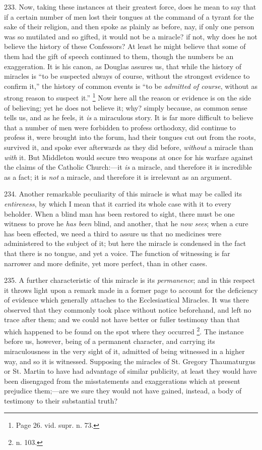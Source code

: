 233.
Now, taking these instances at their greatest force, does he mean to
say that if a certain number of men lost their tongues at the command
of a tyrant for the sake of their religion, and then spoke as plainly
as before, nay, if only one person was so mutilated and so gifted, it
would not be a miracle? if not, why does he not believe the history of
these Confessors? At least he might believe that some of them had the
gift of speech continued to them, though the numbers be an
exaggeration. It is his canon, as Douglas assures us, that while the
history of miracles is ``to be suspected always of course, without the
strongest evidence to confirm it,'' the history of common events is ``to
be \emph{admitted of course}, without as strong reason to suspect it.'' \footnote{Page 26. vid. supr. n. 73.} Now here all the reason or evidence is on the side of
believing; yet he does not believe it; why? simply because, as
common sense tells us, and as he feels, it \emph{is} a miraculous
story. It is far more difficult to believe that a number of men were
forbidden to profess orthodoxy, did continue to profess it, were
brought into the forum, had their tongues cut out from the roots,
survived it, and spoke ever afterwards as they did before, \emph{without}
a miracle than \emph{with} it. But Middleton would secure two weapons
at once for his warfare against the claims of the Catholic
Church:—it \emph{is} a miracle, and therefore it is incredible as a
fact; it is \emph{not} a miracle, and therefore it is irrelevant as an
argument.

234.
Another remarkable peculiarity of this miracle is what may be called
its \emph{entireness}, by which I mean that it carried its whole case
with it to every beholder. When a blind man has been restored to
sight, there must be one witness to prove he \emph{has been} blind,
and another, that he \emph{now sees}; when a cure has been effected,
we need a third to assure us that no medicines were administered to
the subject of it; but here the miracle is condensed in the fact that
there is no tongue, and yet a voice. The function of witnessing is far
narrower and more definite, yet more perfect, than in other cases.

235.
A further characteristic of this miracle is its \emph{permanence}; and
in this respect it throws light upon a remark made in a former page to
account for the deficiency of evidence which generally attaches to the
Ecclesiastical Miracles. It was there observed that they
commonly took place without notice beforehand, and left no trace after
them; and we could not have better or fuller testimony than that which
happened to be found on the spot where they occurred \footnote{n. 103.}. The instance before us, however, being of a permanent
character, and carrying its miraculousness in the very sight of it,
admitted of being witnessed in a higher way, and so it is witnessed.
Supposing the miracles of St. Gregory Thaumaturgus or St. Martin to
have had advantage of similar publicity, at least they would have been
disengaged from the misstatements and exaggerations which at present
prejudice them;—are we sure they would not have gained, instead, a
body of testimony to their substantial truth?


